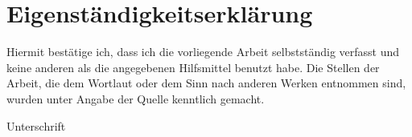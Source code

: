 \clearpage
\section*{Eigenständigkeitserklärung}
\noindent Hiermit bestätige ich, dass ich die vorliegende Arbeit selbstständig verfasst und keine anderen als die angegebenen Hilfsmittel benutzt habe. Die Stellen der Arbeit, die dem Wortlaut oder dem Sinn nach anderen Werken entnommen sind, wurden unter Angabe der Quelle kenntlich gemacht.

\vspace{1cm}

\noindent Unterschrift

\clearpage
